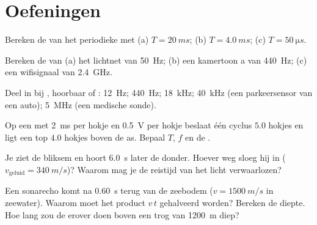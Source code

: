 \section{Oefeningen}

\begin{exercise}[$\star$]\label{exo:g10:signals-and-waves:1}
Bereken de  van het periodieke  met 
(a) $T = \qty{20}{ms}$; (b) $T = \qty{4.0}{ms}$;
(c) $T = \qty{50}{\micro s}$.
\end{exercise}

\begin{exercise}[$\star$]\label{exo:g10:signals-and-waves:2}
Bereken de  van (a) het lichtnet van \qty{50}{Hz}; (b) een
kamertoon a van \qty{440}{Hz}; (c) een wifisignaal van \qty{2.4}{GHz}.
\end{exercise}

\begin{exercise}[$\star$]\label{exo:g10:signals-and-waves:3}
Deel in bij , hoorbaar  of : \qty{12}{Hz};
\qty{440}{Hz}; \qty{18}{kHz}; \qty{40}{kHz} (een parkeersensor van een
auto); \qty{5}{MHz} (een medische sonde).
\end{exercise}

\begin{exercise}[$\star$]\label{exo:g10:signals-and-waves:4}
Op een  met \qty{2}{ms} per hokje en \qty{0.5}{V} per hokje
beslaat één cyclus $5.0$ hokjes en ligt een top $4.0$ hokjes boven de
as. Bepaal $T$, $f$ en de .
\end{exercise}

\begin{exercise}[$\star$]\label{exo:g10:signals-and-waves:5}
Je ziet de bliksem en hoort \qty{6.0}{s} later de donder. Hoever weg
sloeg hij in ($v_{\text{geluid}} = \qty{340}{m/s}$)? Waarom mag je de
reistijd van het licht verwaarlozen?
\end{exercise}

\begin{exercise}[$\star\star$]\label{exo:g10:signals-and-waves:6}
Een sonarecho komt na \qty{0.60}{s} terug van de zeebodem
($v = \qty{1500}{m/s}$ in zeewater). Waarom moet het product $v\,t$
gehalveerd worden? Bereken de diepte. Hoe lang zou de  erover doen
boven een trog van \qty{1200}{m} diep?
\end{exercise}

